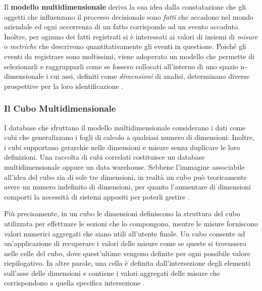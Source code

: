 Il \textbf{modello multidimensionale} deriva la sua idea dalla constatazione che gli oggetti che influenzano il processo decisionale sono \textit{fatti} che accadono nel mondo aziendale ed ogni occorrenza di un fatto corrisponde ad un evento accaduto. Inoltre, per ognuno dei fatti registrati si è interessati ai valori di insiemi di \textit{misure} o \textit{metriche} che descrivono quantitativamente gli eventi in questione. Poiché gli eventi da registrare sono moltissimi, viene adoperato un modello che permette di selezionarli e raggrupparli come se fossero collocati all'interno di uno spazio n-dimensionale i cui assi, definiti come \textit{dimensioni} di analisi, determinano diverse prospettive per la loro identificazione \cite{unibo_introduzione_al_data_warehousing}.

\subsubsection{Il Cubo Multidimensionale}

I database che sfruttano il modello multidimensionale considerano i dati come cubi che generalizzano i fogli di calcolo a qualsiasi numero di dimensioni. Inoltre, i cubi supportano gerarchie nelle dimensioni e misure senza duplicare le loro definizioni. Una raccolta di cubi correlati costituisce un database multidimensionale oppure un data warehouse. Sebbene l'immagine associabile all'idea del cubo sia di sole tre dimensioni, in realtà un cubo può teoricamente avere un numero indefinito di dimensioni, per quanto l'aumentare di dimensioni comporti la necessità di sistemi appositi per poterli gestire \cite{researchgate_multidimensional_db}.

Più precisamente, in un cubo le dimensioni definiscono la struttura del cubo utilizzata per effettuare le sezioni che lo compongono, mentre le misure forniscono valori numerici aggregati che siano utili all'utente finale. Un cubo consente ad un'applicazione di recuperare i valori delle misure come se queste si trovassero nelle celle del cubo, dove quest'ultime vengono definite per ogni possibile valore riepilogativo. In altre parole, una cella è definita dall'intersezione degli elementi sull'asse delle dimensioni e contiene i valori aggregati delle misure che corrispondono a quella specifica intersezione \cite{microsoft_multidimensional_models}.


